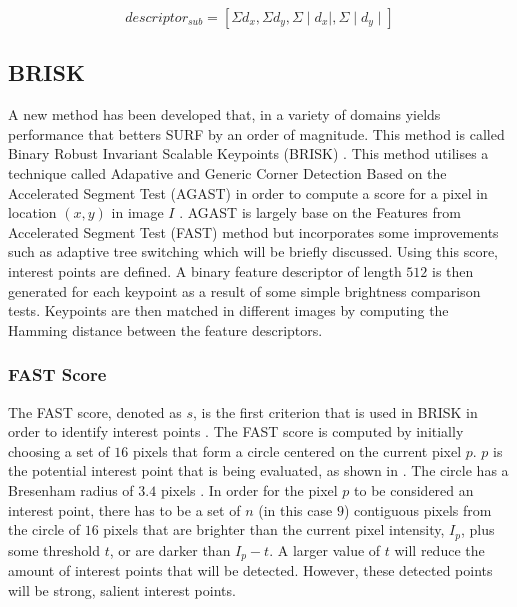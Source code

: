 \documentclass{article}
\begin{document}
\begin{equation}
descriptor_{sub} = [\Sigma d_x, \Sigma d_y,  \Sigma \mid d_x \mid , \Sigma \mid d_y \mid] 
\label{eqn:descriptorSub}
\end{equation} 



\subsection{BRISK}
\label{sec:brisk}
A new method has been developed that, in a variety of domains yields performance that betters SURF by an order of magnitude. This method is called Binary Robust Invariant Scalable Keypoints (BRISK) \cite{Leutenegger2011}. This method utilises a technique called Adapative and Generic Corner Detection Based on the Accelerated Segment Test (AGAST) in order to compute a score for a pixel in location $(x,y)$ in image $I$ \cite{Mair2010}. AGAST is largely base on the Features from Accelerated Segment Test (FAST) \cite{Rosten2006} method but incorporates some improvements such as adaptive tree switching which will be briefly discussed. Using this score, interest points are defined. A binary feature descriptor of length $512$ is then generated for each keypoint as a result of some simple brightness comparison tests. Keypoints are then matched in different images by computing the Hamming distance between the feature descriptors. \\

\subsubsection{FAST Score}
\label{sec:fastScore}

The FAST score, denoted as $s$, is the first criterion that is used in BRISK in order to identify interest points \cite{Rosten2006}. The FAST score is computed by initially choosing a set of $16$ pixels that form a circle centered on the current pixel $p$. $p$ is the potential interest point that is being evaluated, as shown in . The circle has a Bresenham radius of $3.4$ pixels \cite{Mair2010}. In order for the pixel $p$ to be considered an interest point, there has to be a set of $n$ (in this case $9$) contiguous pixels from the circle of $16$ pixels that are brighter than the current pixel intensity, $I_p$, plus some threshold $t$, or are darker than $I_p - t$. A larger value of $t$ will reduce the amount of interest points that will be detected. However, these detected points will be strong, salient interest points. \\
\end{document}

